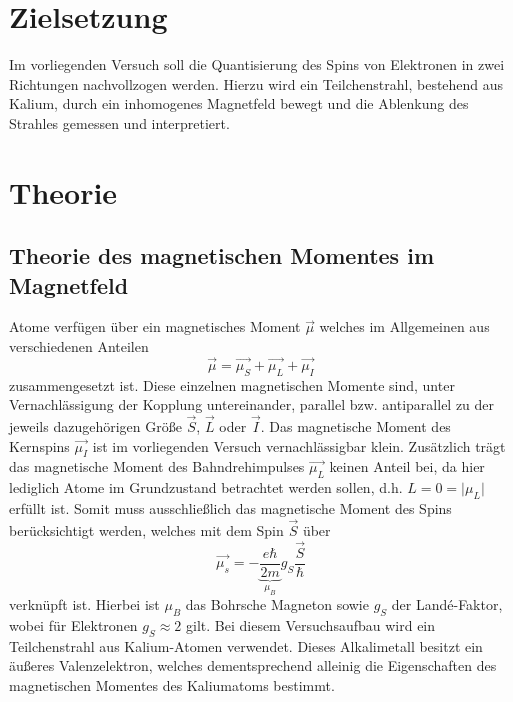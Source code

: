 \section{Zielsetzung}

Im vorliegenden Versuch soll die Quantisierung des Spins von Elektronen in zwei Richtungen nachvollzogen werden.
Hierzu wird ein Teilchenstrahl, bestehend aus Kalium, durch ein inhomogenes Magnetfeld bewegt und die Ablenkung des Strahles gemessen und interpretiert.

\section{Theorie}
\subsection{Theorie des magnetischen Momentes im Magnetfeld}
\label{sec:Theorie}
Atome verfügen über ein magnetisches Moment $\vec{\mu}$ welches im Allgemeinen aus verschiedenen Anteilen
\begin{equation}
  \vec{\mu} = \vec{\mu_S} + \vec{\mu_L} + \vec{\mu_I}
\end{equation}
zusammengesetzt ist.
Diese einzelnen magnetischen Momente sind, unter Vernachlässigung der Kopplung untereinander, parallel bzw. antiparallel zu der jeweils dazugehörigen Größe $\vec{S}$, $\vec{L}$ oder $\vec{I}$.
Das magnetische Moment des Kernspins $\vec{\mu_I}$ ist im vorliegenden Versuch vernachlässigbar klein.
Zusätzlich trägt das magnetische Moment des Bahndrehimpulses $\vec{\mu_L}$ keinen Anteil bei, da hier lediglich Atome im Grundzustand betrachtet werden sollen, d.h. $L = 0 = \lvert \mu_L \rvert$ erfüllt ist.
Somit muss ausschließlich das magnetische Moment des Spins berücksichtigt werden, welches mit dem Spin $\vec{S}$ über
\begin{equation}
  \vec{\mu_s} = - \underbrace{\frac{e \hbar}{2m}}_{\mu_B} g_S \frac{\vec{S}}{\hbar}
\end{equation}
verknüpft ist.
Hierbei ist $\mu_B$ das Bohrsche Magneton sowie $g_S$ der Land\'{e}-Faktor, wobei für Elektronen $g_S \approx 2$ gilt.
Bei diesem Versuchsaufbau wird ein Teilchenstrahl aus Kalium-Atomen verwendet.
Dieses Alkalimetall besitzt ein äußeres Valenzelektron, welches dementsprechend alleinig die Eigenschaften des magnetischen Momentes des Kaliumatoms bestimmt.

